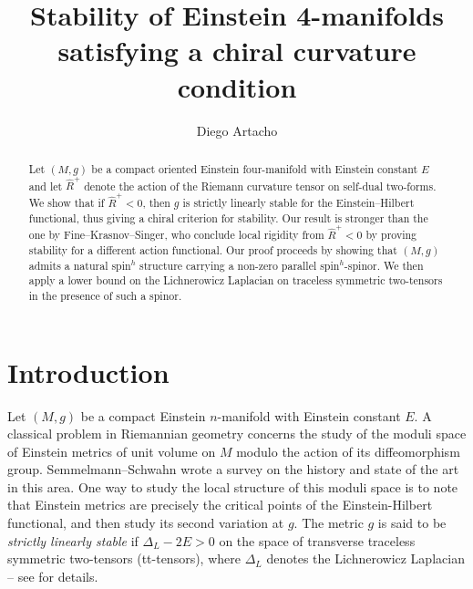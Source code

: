 \documentclass[oneside,12pt]{amsart}
\theoremstyle{definition}
\numberwithin{equation}{section}
\begin{document}
\title[Stability of Einstein 4-manifolds satisfying a chiral curvature condition]{Stability of Einstein 4-manifolds satisfying a chiral curvature condition}

\author{Diego Artacho}
\address{D.~Artacho: Department of Mathematics, KU Leuven, Celestijnenlaan 200B, 3001 Leuven, Belgium}



\begin{abstract}
Let $(M,g)$ be a compact oriented Einstein four-manifold with Einstein constant $E$ and let $\widehat{R}^+$ denote the action of the Riemann curvature tensor on self-dual two-forms. We show that if $\widehat{R}^+ < 0$, then $g$ is strictly linearly stable for the Einstein--Hilbert functional, thus giving a chiral criterion for stability. Our result is stronger than the one by Fine--Krasnov--Singer, who conclude local rigidity from $\widehat{R}^+ < 0$ by proving stability for a different action functional. Our proof proceeds by showing that $(M,g)$ admits a natural spin$^h$ structure carrying a non-zero parallel spin$^h$-spinor. We then apply a lower bound on the Lichnerowicz Laplacian on traceless symmetric two-tensors in the presence of such a spinor. 
\end{abstract}

\maketitle

\section{Introduction}

Let $(M,g)$ be a compact Einstein $n$-manifold with Einstein constant $E$. A classical problem in Riemannian geometry concerns the study of the moduli space of Einstein metrics of unit volume on $M$ modulo the action of its diffeomorphism group. Semmelmann--Schwahn \cite{SS} wrote a survey on the history and state of the art in this area. One way to study the local structure of this moduli space is to note that Einstein metrics are precisely the critical points of the Einstein-Hilbert functional, and then study its second variation at $g$. The metric $g$ is said to be \emph{strictly linearly stable} if $\Delta_L - 2E > 0$ on the space of transverse traceless symmetric two-tensors (tt-tensors), where $\Delta_L$ denotes the Lichnerowicz Laplacian -- see \cite{SS} for details. 
\end{document}
